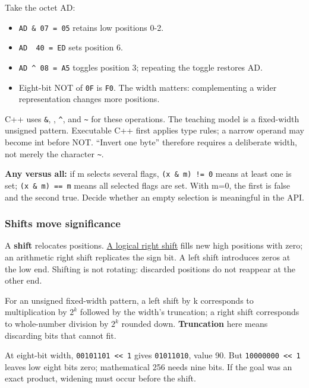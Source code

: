 Take the octet AD:

\begin{itemize}
\tightlist
\item
  \texttt{AD\ \&\ 07\ =\ 05} retains low positions 0-2.
\item
  \texttt{AD\ \textbar{}\ 40\ =\ ED} sets position 6.
\item
  \texttt{AD\ \^{}\ 08\ =\ A5} toggles position 3; repeating the toggle restores AD.
\item
  Eight-bit NOT of \texttt{0F} is \texttt{F0}. The width matters: complementing a wider representation changes more positions.
\end{itemize}

C++ uses \texttt{\&}, \texttt{\textbar{}}, \texttt{\^{}}, and \texttt{\textasciitilde{}} for these operations. The teaching model is a fixed-width unsigned pattern. Executable C++ first applies type rules; a narrow operand may become int before NOT. ``Invert one byte'' therefore requires a deliberate width, not merely the character \texttt{\textasciitilde{}}.

\textbf{Any versus all:} if m selects several flags, \texttt{(x\ \&\ m)\ !=\ 0} means at least one is set; \texttt{(x\ \&\ m)\ ==\ m} means all selected flags are set. With m=0, the first is false and the second true. Decide whether an empty selection is meaningful in the API.

\subsubsection{Shifts move significance}\label{05-engine-i-ch001-shifts-move-significance}

A \textbf{shift} relocates positions. \hyperref[appendix-73425b25118e]{A logical right shift} fills new high positions with zero; an arithmetic right shift replicates the sign bit. A left shift introduces zeros at the low end. Shifting is not rotating: discarded positions do not reappear at the other end.

For an unsigned fixed-width pattern, a left shift by k corresponds to multiplication by \(2^k\) followed by the width's truncation; a right shift corresponds to whole-number division by \(2^k\) rounded down. \textbf{Truncation} here means discarding bits that cannot fit.

At eight-bit width, \texttt{00101101\ \textless{}\textless{}\ 1} gives \texttt{01011010}, value 90. But \texttt{10000000\ \textless{}\textless{}\ 1} leaves low eight bits zero; mathematical 256 needs nine bits. If the goal was an exact product, widening must occur before the shift.

